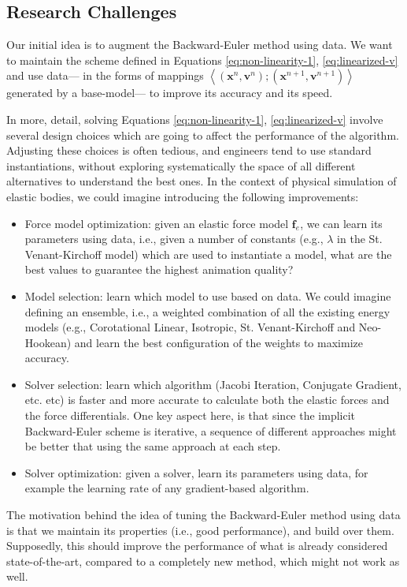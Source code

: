 \documentclass{article} %
\begin{document}
\subsection{Research Challenges}

Our initial idea is to augment the Backward-Euler method using data. We want to maintain the scheme defined in Equations \ref{eq:non-linearity-1}, \ref{eq:linearized-v} and use data--- in the forms of mappings $\left <  (\mathbf{x}^n, \mathbf{v}^n );  (\mathbf{x}^{n+1}, \mathbf{v}^{n+1} ) \right >$ generated by a base-model--- to improve its accuracy and its speed. 

In more, detail, solving Equations  \ref{eq:non-linearity-1}, \ref{eq:linearized-v} involve several design choices which are going to affect the performance of the algorithm. Adjusting these choices is often tedious, and engineers tend to use standard instantiations, without exploring systematically the space of all different alternatives to understand the best ones. In the context of physical simulation of elastic bodies, we could imagine introducing the following improvements:

\begin{itemize}
\item Force model optimization: given an elastic force model $\mathbf{f}_e$, we can learn its parameters using data, i.e., given a number of constants (e.g., $\lambda$ in the St. Venant-Kirchoff model) which are used to instantiate a model, what are the best values to guarantee the highest animation quality?
\item Model selection: learn which model to use based on data. We could imagine defining an ensemble, i.e., a weighted combination of all the existing energy models (e.g., Corotational Linear, Isotropic, St. Venant-Kirchoff and Neo-Hookean) and learn the best configuration of the weights to maximize accuracy. 
\item Solver selection: learn which algorithm (Jacobi Iteration, Conjugate Gradient, etc. etc) is faster and more accurate to calculate both the elastic forces and the force differentials. One key aspect here, is that since the implicit Backward-Euler scheme is iterative, a sequence of different approaches might be better that using the same approach at each step.
\item Solver optimization: given a solver, learn its parameters using data, for example the learning rate of any gradient-based algorithm.
\end{itemize}

The motivation behind the idea of tuning the Backward-Euler method using data is that we maintain its properties (i.e., good performance), and build over them. Supposedly, this should improve the performance of what is already considered state-of-the-art, compared to a completely new method, which might not work as well.  
\end{document}
